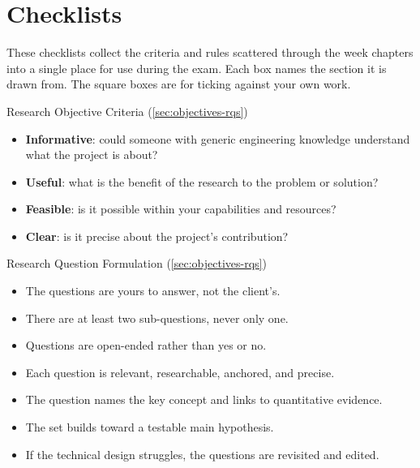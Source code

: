 \documentclass[../main.tex]{subfiles}
\begin{document}
\chapter{Checklists}
\label{ch:checklists}

These checklists collect the criteria and rules scattered through the week chapters into a single place for use during the exam. Each box names the section it is drawn from. The square boxes are for ticking against your own work.

\begin{checklistbox}{Research Objective Criteria \quad (\autoref{sec:objectives-rqs})}
\begin{itemize}[leftmargin=2em]
  \item[\(\square\)] \textbf{Informative}: could someone with generic engineering knowledge understand what the project is about?
  \item[\(\square\)] \textbf{Useful}: what is the benefit of the research to the problem or solution?
  \item[\(\square\)] \textbf{Feasible}: is it possible within your capabilities and resources?
  \item[\(\square\)] \textbf{Clear}: is it precise about the project's contribution?
\end{itemize}
\end{checklistbox}

\begin{checklistbox}{Research Question Formulation \quad (\autoref{sec:objectives-rqs})}
\begin{itemize}[leftmargin=2em]
  \item[\(\square\)] The questions are yours to answer, not the client's.
  \item[\(\square\)] There are at least two sub-questions, never only one.
  \item[\(\square\)] Questions are open-ended rather than yes or no.
  \item[\(\square\)] Each question is relevant, researchable, anchored, and precise.
  \item[\(\square\)] The question names the key concept and links to quantitative evidence.
  \item[\(\square\)] The set builds toward a testable main hypothesis.
  \item[\(\square\)] If the technical design struggles, the questions are revisited and edited.
\end{itemize}
\end{checklistbox}
\end{document}
